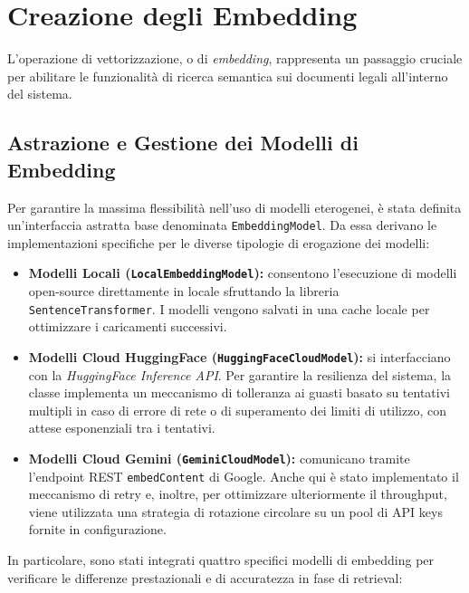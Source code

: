 \section{Creazione degli Embedding}
\label{sec:creazione_embedding}

L'operazione di vettorizzazione, o di \textit{embedding}, rappresenta un passaggio cruciale per abilitare le funzionalità di ricerca semantica sui documenti legali all'interno del sistema.

\subsection{Astrazione e Gestione dei Modelli di Embedding}
Per garantire la massima flessibilità nell'uso di modelli eterogenei, è stata definita un'interfaccia astratta base denominata \texttt{EmbeddingModel}. Da essa derivano le implementazioni specifiche per le diverse tipologie di erogazione dei modelli:

\begin{itemize}
    \item \textbf{Modelli Locali (\texttt{LocalEmbeddingModel}):} consentono l'esecuzione di modelli open-source direttamente in locale sfruttando la libreria \texttt{SentenceTransformer}. I modelli vengono salvati in una cache locale per ottimizzare i caricamenti successivi.
    \item \textbf{Modelli Cloud HuggingFace (\texttt{HuggingFaceCloudModel}):} si interfacciano con la \textit{HuggingFace Inference API}. Per garantire la resilienza del sistema, la classe implementa un meccanismo di tolleranza ai guasti basato su tentativi multipli in caso di errore di rete o di superamento dei limiti di utilizzo, con attese esponenziali tra i tentativi.
    \item \textbf{Modelli Cloud Gemini (\texttt{GeminiCloudModel}):} comunicano tramite l'endpoint REST \texttt{embedContent} di Google. Anche qui è stato implementato il meccanismo di retry e, inoltre, per ottimizzare ulteriormente il throughput, viene utilizzata una strategia di rotazione circolare su un pool di API keys fornite in configurazione.
\end{itemize}
In particolare, sono stati integrati quattro specifici modelli di embedding per verificare le differenze prestazionali e di accuratezza in fase di retrieval:

